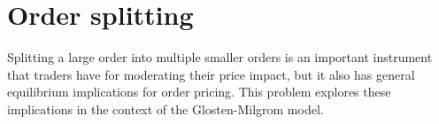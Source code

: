 \documentclass[a4paper]{article}
\begin{document}
	
	
\fi




\section{Order splitting}
Splitting a large order into multiple smaller orders is an important instrument that traders have for moderating their price impact, but it also has general equilibrium implications for order pricing. This problem explores these implications in the context of the Glosten-Milgrom model.
\end{document}
